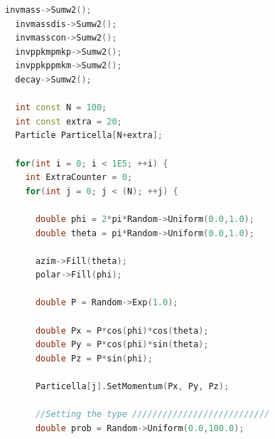 \documentclass[a4paper, 11pt]{article}
\begin{document}
\begin{lstlisting}[language=c++, style=code]
  invmass->Sumw2();
  invmassdis->Sumw2();
  invmasscon->Sumw2();
  invppkmpmkp->Sumw2();
  invppkppmkm->Sumw2();
  decay->Sumw2();

  int const N = 100;
  int const extra = 20;
  Particle Particella[N+extra];

  for(int i = 0; i < 1E5; ++i) {
    int ExtraCounter = 0;
    for(int j = 0; j < (N); ++j) {

      double phi = 2*pi*Random->Uniform(0.0,1.0);
      double theta = pi*Random->Uniform(0.0,1.0);

      azim->Fill(theta);
      polar->Fill(phi);

      double P = Random->Exp(1.0);

      double Px = P*cos(phi)*cos(theta);
      double Py = P*cos(phi)*sin(theta);
      double Pz = P*sin(phi);

      Particella[j].SetMomentum(Px, Py, Pz);

      //Setting the type ///////////////////////////
      double prob = Random->Uniform(0.0,100.0);


\end{lstlisting}
\end{document}
